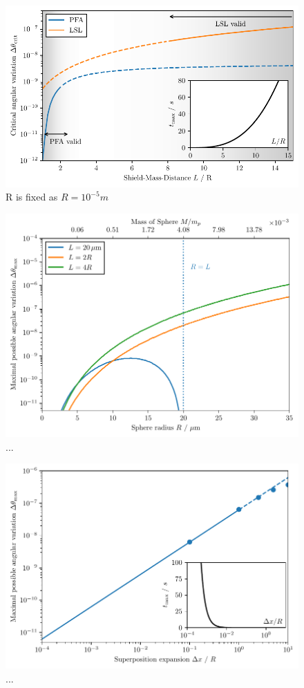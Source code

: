 \begin{figure}[!htbp]
  \centering
  \includegraphics[width=\textwidth]{./../figures/theta-variance/theta-crit-L.pdf}
  \caption{R is fixed as $R=10^{-5}\si{m}$}
  \label{fig:4:theta-crit-L}
\end{figure}

\begin{figure}[!htbp]
  \centering
  \includegraphics[width=\textwidth]{./../figures/theta-variance/theta-max-mass.pdf}
  \caption{...}
  \label{fig:4:theta-crit-mass}
\end{figure}

\begin{figure}[!htbp]
  \centering
  \includegraphics[width=\textwidth]{./../figures/theta-variance/theta-max-superpos-extension.pdf}
  \caption{...}
  \label{fig:4:theta-crit-superposition-size}
\end{figure}



% 
